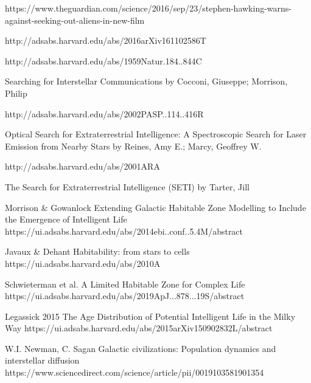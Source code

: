 
https://www.theguardian.com/science/2016/sep/23/stephen-hawking-warns-against-seeking-out-aliens-in-new-film




http://adsabs.harvard.edu/abs/2016arXiv161102586T







http://adsabs.harvard.edu/abs/1959Natur.184..844C

Searching for Interstellar Communications
by Cocconi, Giuseppe; Morrison, Philip


http://adsabs.harvard.edu/abs/2002PASP..114..416R

Optical Search for Extraterrestrial Intelligence: A Spectroscopic Search for Laser Emission from Nearby Stars
by Reines, Amy E.; Marcy, Geoffrey W.

http://adsabs.harvard.edu/abs/2001ARA%

The Search for Extraterrestrial Intelligence (SETI)
by Tarter, Jill




 





Morrison & Gowanlock
Extending Galactic Habitable Zone Modelling to Include the Emergence of Intelligent Life
https://ui.adsabs.harvard.edu/abs/2014ebi..conf..5.4M/abstract

Javaux & Dehant
Habitability: from stars to cells
https://ui.adsabs.harvard.edu/abs/2010A%

Schwieterman et al.
A Limited Habitable Zone for Complex Life
https://ui.adsabs.harvard.edu/abs/2019ApJ...878...19S/abstract






Legassick 2015
The Age Distribution of Potential Intelligent Life in the Milky Way
https://ui.adsabs.harvard.edu/abs/2015arXiv150902832L/abstract





W.I. Newman, C. Sagan 
Galactic civilizations: Population dynamics and interstellar diffusion
https://www.sciencedirect.com/science/article/pii/0019103581901354





